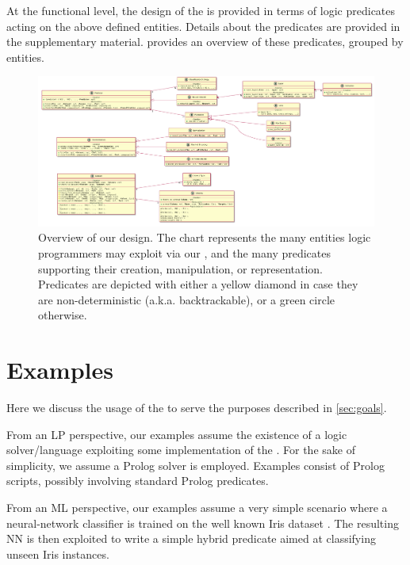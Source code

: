 \documentclass[runningheads]{llncs}
\begin{document}
At the functional level, the design of the \mllib{} is provided in terms of logic predicates acting on the above defined entities.
%
Details about the predicates are provided in the supplementary material.
%
 provides an overview of these predicates, grouped by entities.

\begin{figure}
    \centering
    \includegraphics[width=\linewidth]{figures/entities.pdf}
    \caption{Overview of our \mllib{} design. The chart represents the many entities logic programmers may exploit via our \mllib{}, and the many predicates supporting their creation, manipulation, or representation. Predicates are depicted with either a yellow diamond in case they are non-deterministic (a.k.a. backtrackable), or a green circle otherwise.}
    \label{fig:design-overview}
\end{figure}

\section{\mllib{} Examples}
\label{sec:examples}

Here we discuss the usage of the \mllib{} to serve the purposes described in \cref{sec:goals}.

From an LP perspective, our examples assume the existence of a logic solver/language exploiting some implementation of the \mllib{}.
%
For the sake of simplicity, we assume a Prolog solver is employed.
%
Examples consist of Prolog scripts, possibly involving standard Prolog predicates.

From an ML perspective, our examples assume a very simple scenario where a neural-network classifier is trained on the well known Iris dataset \cite{iris-dataset}.
%
The resulting NN is then exploited to write a simple hybrid predicate aimed at classifying unseen Iris instances.
\end{document}
